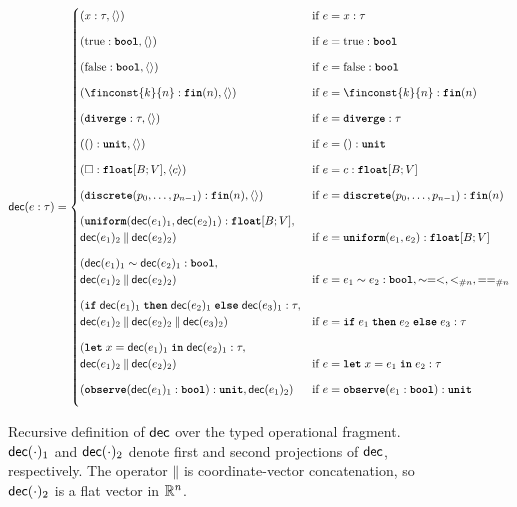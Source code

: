 \begin{figure}
    \small
	\centering
	\begin{align*}
		\decompose(e : \tau) =
		\begin{cases}
			(x : \tau, \langle\rangle)
				& \text{if } e = x : \tau \\[8pt]
			(\true : \bool, \langle\rangle)
				& \text{if } e = \true : \bool \\[8pt]
			(\false : \bool, \langle\rangle)
				& \text{if } e = \false : \bool \\[8pt]
			(\finconst{k}{n} : \fin{n}, \langle\rangle)
				& \text{if } e = \finconst{k}{n} : \fin{n} \\[8pt]
			(\diverge : \tau, \langle\rangle)
				& \text{if } e = \diverge : \tau \\[8pt]
			(() : \unit, \langle\rangle)
				& \text{if } e = () : \unit \\[8pt]
			(\square : \floattype{B}{V}, \langle c\rangle)
				& \text{if } e = c : \floattype{B}{V} \\[8pt]
			(\discrete(p_0,\ldots,p_{n-1}) : \fin{n}, \langle\rangle)
				& \text{if } e = \discrete(p_0,\ldots,p_{n-1}) : \fin{n} \\[8pt]
			(\uniform(\decompose(e_1)_1,\decompose(e_2)_1) : \floattype{B}{V}, \\
			\decompose(e_1)_2 \mathbin{\|} \decompose(e_2)_2)
				& \text{if } e = \uniform(e_1,e_2) : \floattype{B}{V} \\[8pt]
			(\decompose(e_1)_1 \sim \decompose(e_2)_1 : \bool, \\
			\decompose(e_1)_2 \mathbin{\|} \decompose(e_2)_2)
				& \text{if } e = e_1 \sim e_2 : \bool, \sim = <, \finlt{n}, \fineq{n} \\[8pt]
            (\ifkw\; \decompose(e_1)_1\; \thenkw\; \decompose(e_2)_1\; \elsekw\; \decompose(e_3)_1 : \tau, \\
            \decompose(e_1)_2 \mathbin{\|} \decompose(e_2)_2
			\mathbin{\|} \decompose(e_3)_2)
                & \text{if } e = \ifkw\; e_1\; \thenkw\; e_2\; \elsekw\; e_3 : \tau \\[8pt]
            (\letkw\; x = \decompose(e_1)_1\; \inkw\; \decompose(e_2)_1 : \tau, \\
            \decompose(e_1)_2 \mathbin{\|} \decompose(e_2)_2)
                & \text{if } e = \letkw\; x = e_1\; \inkw\; e_2 : \tau \\[8pt]
            (\observekw(\decompose(e_1)_1 : \bool) : \unit, \decompose(e_1)_2)
                & \text{if } e = \observekw(e_1 : \bool) : \unit \\[8pt]
		\end{cases}
	\end{align*}
	\caption{Recursive definition of $\mathsf{dec}$ over the typed operational fragment. $\mathsf{dec}(\cdot)_1$ and $\mathsf{dec}(\cdot)_2$ denote first and second projections of $\mathsf{dec}$, respectively. The operator $\mathbin{\|}$ is coordinate-vector concatenation, so $\mathsf{dec}(\cdot)_2$ is a flat vector in $\mathbb{R}^n$.}
	\label{fig:decompose-definition-1}
\end{figure}

